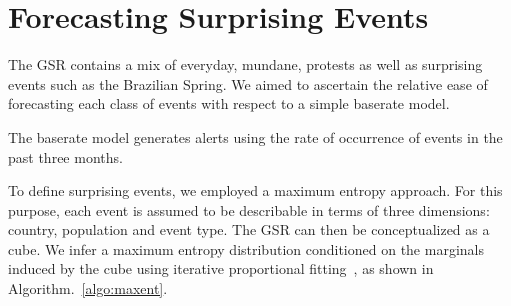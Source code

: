 


\section{Forecasting Surprising Events}
\label{sec:suprising}
The GSR contains a mix of everyday, mundane, protests as well as surprising events such as the Brazilian Spring.
We aimed to ascertain the relative ease of forecasting each class of events
with respect to a simple baserate model.

The baserate model generates alerts using the rate of occurrence of events in the past three months.

To define surprising events,
we employed a maximum entropy approach. For this purpose, each event is assumed
to be describable
in terms of three dimensions: country, population and event type. The GSR can then be conceptualized
as a cube. We infer a maximum entropy distribution conditioned on the marginals
induced by the cube using iterative proportional fitting~\cite{bishop2007discrete}, as shown in Algorithm.~\ref{algo:maxent}.


%
%

